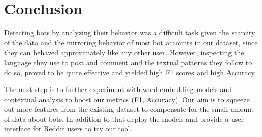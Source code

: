 \documentclass{article}
\begin{document}
 
 \section{Conclusion}
 Detecting bots by analyzing their behavior was a difficult task given the scarcity of the data and the mirroring behavior of most bot accounts in our dataset, since they can behaved approximately like any other user. However, inspecting the language they use to post and comment and the textual patterns they follow to do so, proved to be quite effective and yielded high F1 scores and high Accuracy. \par
 The next step is to further experiment with word embedding models and contextual analysis to boost our metrics (F1, Accuracy). Our aim is to squeeze out more features from the existing dataset to compensate for the small amount of data about bots. In addition to that deploy the models and provide a user interface for Reddit users to try our tool. \par
\end{document}
